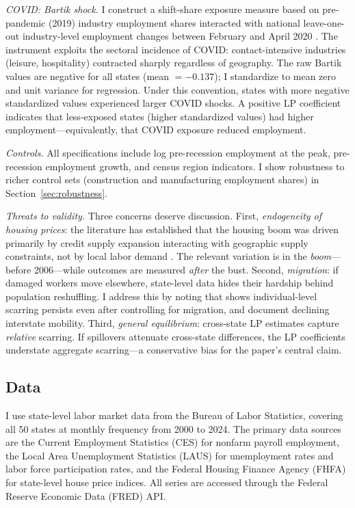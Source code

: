 \documentclass[12pt]{article}
\begin{document}
\textit{COVID: Bartik shock.} I construct a shift-share exposure measure based on pre-pandemic (2019) industry employment shares interacted with national leave-one-out industry-level employment changes between February and April 2020 \citep{goldsmith2020bartik, borusyak2022quasi}. The instrument exploits the sectoral incidence of COVID: contact-intensive industries (leisure, hospitality) contracted sharply regardless of geography. The raw Bartik values are negative for all states (mean $= -0.137$); I standardize to mean zero and unit variance for regression. Under this convention, states with more negative standardized values experienced larger COVID shocks. A positive LP coefficient indicates that less-exposed states (higher standardized values) had higher employment---equivalently, that COVID exposure reduced employment.

\textit{Controls.} All specifications include log pre-recession employment at the peak, pre-recession employment growth, and census region indicators. I show robustness to richer control sets (construction and manufacturing employment shares) in Section~\ref{sec:robustness}.

\textit{Threats to validity.} Three concerns deserve discussion. First, \textit{endogeneity of housing prices}: the literature has established that the housing boom was driven primarily by credit supply expansion interacting with geographic supply constraints, not by local labor demand \citep{mian2013household}. The relevant variation is in the \textit{boom}---before 2006---while outcomes are measured \textit{after} the bust. Second, \textit{migration}: if damaged workers move elsewhere, state-level data hides their hardship behind population reshuffling. I address this by noting that \citet{yagan2019employment} shows individual-level scarring persists even after controlling for migration, and \citet{dao2017regional} document declining interstate mobility. Third, \textit{general equilibrium}: cross-state LP estimates capture \textit{relative} scarring. If spillovers attenuate cross-state differences, the LP coefficients understate aggregate scarring---a conservative bias for the paper's central claim.

\subsection{Data}

I use state-level labor market data from the Bureau of Labor Statistics, covering all 50 states at monthly frequency from 2000 to 2024. The primary data sources are the Current Employment Statistics (CES) for nonfarm payroll employment, the Local Area Unemployment Statistics (LAUS) for unemployment rates and labor force participation rates, and the Federal Housing Finance Agency (FHFA) for state-level house price indices. All series are accessed through the Federal Reserve Economic Data (FRED) API.
\end{document}
